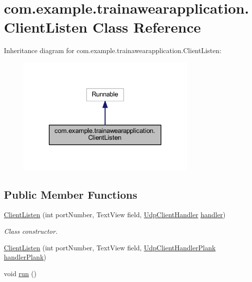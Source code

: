\hypertarget{classcom_1_1example_1_1trainawearapplication_1_1_client_listen}{}\section{com.\+example.\+trainawearapplication.\+Client\+Listen Class Reference}
\label{classcom_1_1example_1_1trainawearapplication_1_1_client_listen}


Inheritance diagram for com.\+example.\+trainawearapplication.\+Client\+Listen\+:
\nopagebreak
\begin{figure}[H]
\begin{center}
\leavevmode
\includegraphics[width=252pt]{classcom_1_1example_1_1trainawearapplication_1_1_client_listen__inherit__graph}
\end{center}
\end{figure}
\subsection*{Public Member Functions}
\begin{DoxyCompactItemize}
\item 
\mbox{\hyperlink{classcom_1_1example_1_1trainawearapplication_1_1_client_listen_a24ac2c031ded11c7a5ce64dae1694253}{Client\+Listen}} (int port\+Number, Text\+View field, \mbox{\hyperlink{classcom_1_1example_1_1trainawearapplication_1_1_udp_client_handler}{Udp\+Client\+Handler}} \mbox{\hyperlink{classcom_1_1example_1_1trainawearapplication_1_1_client_listen_a6d6b6e018a0bc75068445635b2eacd26}{handler}})
\begin{DoxyCompactList}\small\item\em Class constructor. \end{DoxyCompactList}\item 
\mbox{\hyperlink{classcom_1_1example_1_1trainawearapplication_1_1_client_listen_ae0a26fe4b938f8a52e10e6f43665e23c}{Client\+Listen}} (int port\+Number, Text\+View field, \mbox{\hyperlink{classcom_1_1example_1_1trainawearapplication_1_1_udp_client_handler_plank}{Udp\+Client\+Handler\+Plank}} \mbox{\hyperlink{classcom_1_1example_1_1trainawearapplication_1_1_client_listen_ad3b38ad71c2120e19c5f820053863a64}{handler\+Plank}})
\item 
void \mbox{\hyperlink{classcom_1_1example_1_1trainawearapplication_1_1_client_listen_adcb69d9825d6d9e182905cf9b4aa4d7d}{run}} ()
\end{DoxyCompactItemize}
